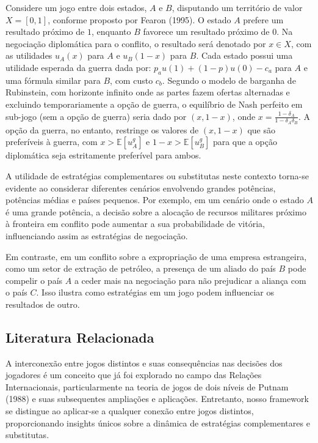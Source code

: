 \documentclass[]{interact}
\theoremstyle{plain}%
\theoremstyle{definition}
\theoremstyle{remark}
\begin{document}
Considere um jogo entre dois estados, \(A\) e \(B\), disputando um
território de valor \(X = [0,1]\), conforme proposto por Fearon (1995).
O estado \(A\) prefere um resultado próximo de \(1\), enquanto \(B\)
favorece um resultado próximo de \(0\). Na negociação diplomática para o
conflito, o resultado será denotado por \(x \in X\), com as utilidades
\(u_A(x)\) para \(A\) e \(u_B(1-x)\) para \(B\). Cada estado possui uma
utilidade esperada da guerra dada por: \(p_a u(1) + (1-p)u(0) - c_a\)
para \(A\) e uma fórmula similar para \(B\), com custo \(c_b\). Segundo
o modelo de barganha de Rubinstein, com horizonte infinito onde as
partes fazem ofertas alternadas e excluindo temporariamente a opção de
guerra, o equilíbrio de Nash perfeito em sub-jogo (sem a opção de
guerra) seria dado por \((x, 1-x)\), onde
\(x = \frac{1 -\delta_A}{1 - \delta_A \delta_B}\). A opção da guerra, no
entanto, restringe os valores de \((x, 1-x)\) que são preferíveis à
guerra, com \(x > \mathbb{E}[u^g_A]\) e \(1 - x > \mathbb{E}[u^g_B]\)
para que a opção diplomática seja estritamente preferível para ambos.

A utilidade de estratégias complementares ou substitutas neste contexto
torna-se evidente ao considerar diferentes cenários envolvendo grandes
potências, potências médias e países pequenos. Por exemplo, em um
cenário onde o estado \(A\) é uma grande potência, a decisão sobre a
alocação de recursos militares próximo à fronteira em conflito pode
aumentar a sua probabilidade de vitória, influenciando assim as
estratégias de negociação.

Em contraste, em um conflito sobre a expropriação de uma empresa
estrangeira, como um setor de extração de petróleo, a presença de um
aliado do país \(B\) pode compelir o país \(A\) a ceder mais na
negociação para não prejudicar a aliança com o país \(C\). Isso ilustra
como estratégias em um jogo podem influenciar os resultados de outro.

\hypertarget{literatura-relacionada}{%
\subsection{Literatura Relacionada}\label{literatura-relacionada}}

A interconexão entre jogos distintos e suas consequências nas decisões
dos jogadores é um conceito que já foi explorado no campo das Relações
Internacionais, particularmente na teoria de jogos de dois níveis de
Putnam (1988) e suas subsequentes ampliações e aplicações. Entretanto,
nosso framework se distingue ao aplicar-se a qualquer conexão entre
jogos distintos, proporcionando insights únicos sobre a dinâmica de
estratégias complementares e substitutas.
\end{document}
